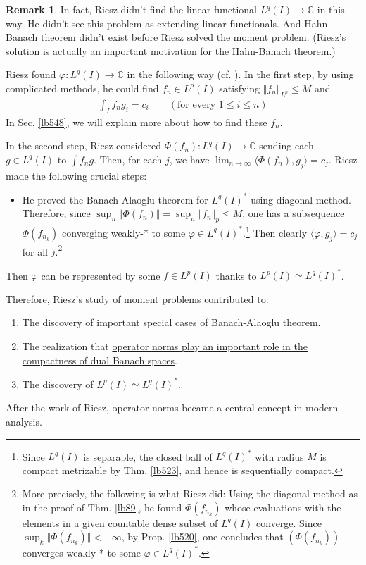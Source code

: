 \documentclass[12pt,b5paper,notitlepage]{article}
\theoremstyle{definition}
\newtheorem{rem}[df]{Remark}
\theoremstyle{plain}
\newcommand{\bk}[1]{\langle {#1}\rangle}
\newcommand{\Cbb}{\mathbb C}
\numberwithin{equation}{section}
\begin{document}
\begin{rem}\label{lb526}
In fact, Riesz didn't find the linear functional $L^q(I)\rightarrow\Cbb$ in this way. He didn't see this problem as extending linear functionals. And Hahn-Banach theorem didn't exist before Riesz solved the moment problem. (Riesz's solution is actually an important motivation for the Hahn-Banach theorem.)

Riesz found $\varphi:L^q(I)\rightarrow\Cbb$ in the following way (cf. \cite[Sec. VI.2]{Die-H}). In the first step, by using complicated methods, he could find $f_n\in L^p(I)$ satisfying $\Vert f_n\Vert_{L^p}\leq M$ and 
\begin{align*}
\int_I f_ng_i=c_i\qquad(\text{for every }1\leq i\leq n)
\end{align*}
In Sec. \ref{lb548}, we will explain more about how to find these $f_n$.

In the second step, Riesz considered $\Phi(f_n):L^q(I)\rightarrow\Cbb$ sending each $g\in L^q(I)$ to $\int f_ng$. Then, for each $j$, we have $\lim_{n\rightarrow\infty}\bk{\Phi(f_n),g_j}=c_j$. Riesz made the following crucial steps:
\begin{itemize}
\item He proved the Banach-Alaoglu theorem for $L^q(I)^*$ using diagonal method. %
Therefore, since $\sup_n \Vert\Phi(f_n)\Vert=\sup_n\Vert f_n\Vert_p\leq M$, one has a subsequence $\Phi(f_{n_k})$  converging weakly-* to some $\varphi\in L^q(I)^*$.\footnote{Since $L^q(I)$ is separable, the closed ball of $L^q(I)^*$ with radius $M$ is compact metrizable by Thm. \ref{lb523}, and hence is sequentially compact.}  Then clearly $\bk{\varphi,g_j}=c_j$ for all $j$.\footnote{More precisely, the following is what Riesz did: Using the diagonal method as in the proof of Thm. \ref{lb89}, he found $\Phi(f_{n_k})$ whose evaluations with the elements in a given countable dense subset of $L^q(I)$ converge. Since $\sup_k\Vert\Phi(f_{n_k})\Vert<+\infty$, by Prop. \ref{lb520}, one concludes that $(\Phi(f_{n_k}))$ converges weakly-* to some $\varphi\in L^q(I)^*$.}
\end{itemize}
Then $\varphi$ can be represented by some $f\in L^p(I)$ thanks to $L^p(I)\simeq L^q(I)^*$. \hfill\qedsymbol
\end{rem}

Therefore, Riesz's study of moment problems contributed to:
\begin{enumerate}[label=(\alph*)]
\item The discovery of important special cases of Banach-Alaoglu theorem.
\item The realization that \uline{operator norms play an important role in the compactness of dual Banach spaces}.
\item The discovery of $L^p(I)\simeq L^q(I)^*$.
\end{enumerate}
After the work of Riesz, operator norms became a central concept in modern analysis.  
\end{document}
